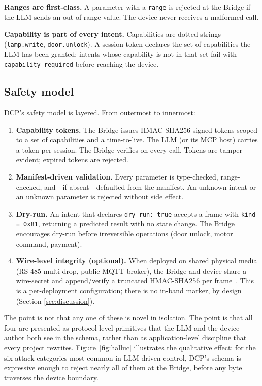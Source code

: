 \documentclass[11pt,a4paper]{article}
\begin{document}
\textbf{Ranges are first-class.} A parameter with a \texttt{range} is
rejected at the Bridge if the LLM sends an out-of-range value. The device
never receives a malformed call.

\textbf{Capability is part of every intent.} Capabilities are dotted
strings (\texttt{lamp.write}, \texttt{door.unlock}). A session token
declares the set of capabilities the LLM has been granted; intents whose
capability is not in that set fail with \texttt{capability\_required}
before reaching the device.

\subsection{Safety model}\label{sec:safety}

DCP's safety model is layered. From outermost to innermost:

\begin{enumerate}[leftmargin=*,nosep]
  \item \textbf{Capability tokens.} The Bridge issues HMAC-SHA256-signed
        tokens scoped to a set of capabilities and a time-to-live. The
        LLM (or its MCP host) carries a token per session. The Bridge
        verifies on every call. Tokens are tamper-evident; expired tokens
        are rejected.
  \item \textbf{Manifest-driven validation.} Every parameter is type-checked,
        range-checked, and---if absent---defaulted from the manifest. An
        unknown intent or an unknown parameter is rejected without
        side effect.
  \item \textbf{Dry-run.} An intent that declares \texttt{dry\_run: true}
        accepts a frame with \texttt{kind = 0x81}, returning a predicted
        result with no state change. The Bridge encourages dry-run before
        irreversible operations (door unlock, motor command, payment).
  \item \textbf{Wire-level integrity (optional).} When deployed on shared
        physical media (RS-485 multi-drop, public MQTT broker), the Bridge
        and device share a wire-secret and append/verify a truncated
        HMAC-SHA256 per frame~\cite{rfc2104,fips180}. This is a per-deployment
        configuration; there is no in-band marker, by design (Section
        \ref{sec:discussion}).
\end{enumerate}

The point is not that any one of these is novel in isolation. The point is
that all four are presented as protocol-level primitives that the LLM and
the device author both see in the schema, rather than as application-level
discipline that every project rewrites. Figure~\ref{fig:halluc}
illustrates the qualitative effect: for the six attack categories most
common in LLM-driven control, DCP's schema is expressive enough to reject
nearly all of them at the Bridge, before any byte traverses the device
boundary.
\end{document}
